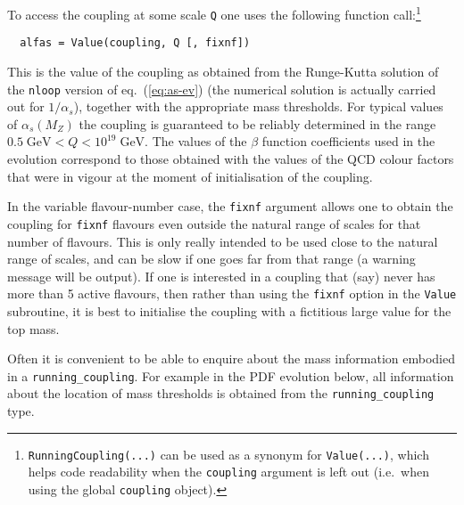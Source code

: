 \documentclass[12pt]{article}
\newcommand{\GeV}{\;\mathrm{GeV}}
\newcommand{\as}{\alpha_s}
\newcommand{\ttt}[1]{\texttt{#1}}
\begin{document}
To access the coupling at some scale \ttt{Q} one uses the following
function call:\footnote{\texttt{RunningCoupling(...)} can be used as a
    synonym for \texttt{Value(...)}, which helps code readability when the
    \texttt{coupling} argument is left out (i.e.\ when using the
    global \texttt{coupling} object).}
\begin{lstlisting}
  alfas = Value(coupling, Q [, fixnf])
\end{lstlisting}
This is the value of the coupling as obtained from the Runge-Kutta
solution of the \ttt{nloop} version of eq.~(\ref{eq:as-ev}) (the
numerical solution is actually carried out for $1/\as$), together with the
appropriate mass thresholds. 
%
For typical values of $\as(M_Z)$ the coupling is guaranteed to be reliably
determined in the range $0.5 \GeV < Q < 10^{19}\GeV$. The values of
the $\beta$ function coefficients used in the evolution correspond to
those obtained with the values of the QCD colour factors that were in
vigour at the moment of initialisation of the coupling.

In the variable flavour-number case, the \ttt{fixnf} argument allows
one to obtain the coupling for \ttt{fixnf} flavours even outside the
natural range of scales for that number of flavours. This is only
really intended to be used close to the natural range of scales, and
can be slow if one goes far from that range (a warning message will be
output). If one is interested in a coupling that (say) never has more
than 5 active flavours, then rather than using the \ttt{fixnf} option
in the \ttt{Value} subroutine, it is best to initialise the coupling
with a fictitious large value for the top mass.

Often it is convenient to be able to enquire about the mass information
embodied in a \ttt{running\_coupling}. For example in the PDF
evolution below, all information about the location of mass thresholds is
obtained from the \ttt{running\_coupling} type.
\end{document}
